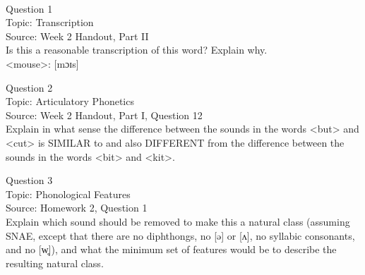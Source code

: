 \documentclass[12pt]{article}
\begin{document}
\newpage

\begin{center}
\textbf{{\color{red}{\HUGE END OF EXAM}}}\\

\end{center}
\newpage

\begin{center}
\textbf{{\color{blue}{\HUGE START OF EXAM\\}}}

\textbf{{\color{blue}{\HUGE Student ID: 79667\\}}}

\textbf{{\color{blue}{\HUGE \\}}}

\end{center}
\newpage

{\large Question 1}\\

Topic: Transcription\\
Source: Week 2 Handout, Part II\\

Is this a reasonable transcription of this word? Explain why.\\

<mouse>: {[mɔɪs]}


\newpage

{\large Question 2}\\

Topic: Articulatory Phonetics\\
Source: Week 2 Handout, Part I, Question 12\\

Explain in what sense the difference between the sounds in the words <but> and <cut> is SIMILAR to and also DIFFERENT from the difference between the sounds in the words <bit> and <kit>.\\


\newpage

{\large Question 3}\\

Topic: Phonological Features\\
Source: Homework 2, Question 1\\

Explain which sound should be removed to make this a natural class (assuming SNAE, except that there are no diphthongs, no [ə] or [ʌ], no syllabic consonants, and no [w̥]), and what the minimum set of features would be to describe the resulting natural class.\\
\end{document}
